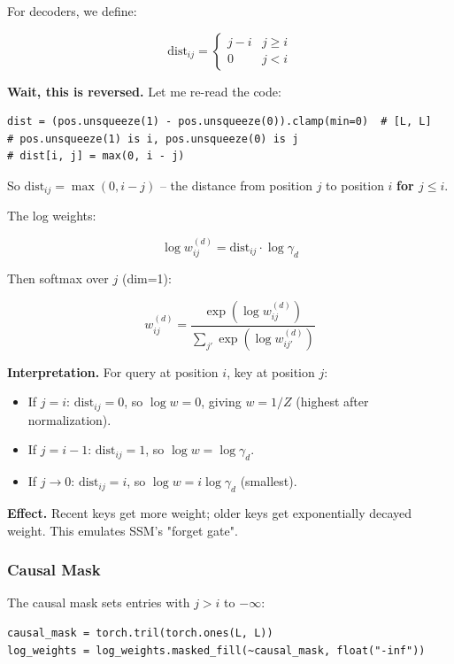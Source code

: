 For decoders, we define:

\[
\text{dist}_{ij} = \begin{cases} j - i & j \geq i \\ 0 & j < i \end{cases}
\tag{4.5}
\]

\textbf{Wait, this is reversed.} Let me re-read the code:

\begin{lstlisting}
dist = (pos.unsqueeze(1) - pos.unsqueeze(0)).clamp(min=0)  # [L, L]
# pos.unsqueeze(1) is i, pos.unsqueeze(0) is j
# dist[i, j] = max(0, i - j)
\end{lstlisting}

So $\text{dist}_{ij} = \max(0, i - j)$ -- the distance from position $j$ to 
position $i$ \textbf{for $j \leq i$}.

The log weights:

\[
\log w_{ij}^{(d)} = \text{dist}_{ij} \cdot \log \gamma_d
\tag{4.6}
\]

Then softmax over $j$ (dim=1):

\[
w_{ij}^{(d)} = \frac{\exp(\log w_{ij}^{(d)})}{\sum_{j'} \exp(\log w_{ij'}^{(d)})}
\tag{4.7}
\]

\textbf{Interpretation.} For query at position $i$, key at position $j$:

\begin{itemize}
\item If $j = i$: $\text{dist}_{ij} = 0$, so $\log w = 0$, giving $w = 1/Z$
  (highest after normalization).
\item If $j = i - 1$: $\text{dist}_{ij} = 1$, so $\log w = \log \gamma_d$.
\item If $j \to 0$: $\text{dist}_{ij} = i$, so $\log w = i \log \gamma_d$
  (smallest).

\end{itemize}
\textbf{Effect.} Recent keys get more weight; older keys get exponentially 
decayed weight. This emulates SSM's "forget gate".

\subsubsection{Causal Mask}

The causal mask sets entries with $j > i$ to $-\infty$:

\begin{lstlisting}
causal_mask = torch.tril(torch.ones(L, L))
log_weights = log_weights.masked_fill(~causal_mask, float("-inf"))
\end{lstlisting}

